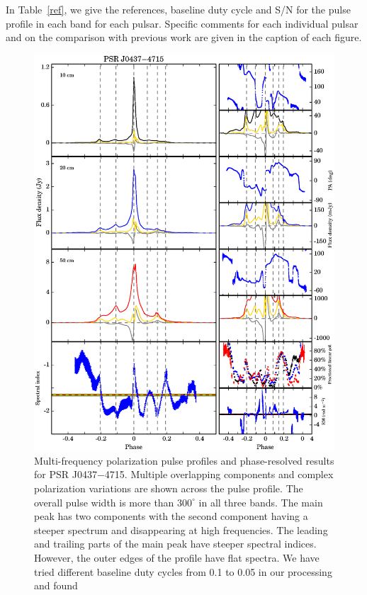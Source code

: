 \documentclass[useAMS,usenatbib]{mn2e}
\begin{document}
\begin{appendix}
In Table~\ref{ref}, we give the references, baseline duty cycle and S/N for the pulse profile in each 
band for each pulsar. Specific comments for each individual pulsar and on the comparison with 
previous work are given in the caption of each figure. 

\newpage
\begin{figure}
\begin{center}
\includegraphics[width=6 in]{0437.ps}
\caption{Multi-frequency polarization pulse profiles and phase-resolved results for PSR J0437$-$4715. 
Multiple overlapping components and complex polarization 
variations are shown across the pulse profile. 
%
The overall pulse width is more than $300^{\circ}$ in all three bands.
%
The main peak has two components with the second component having a steeper 
spectrum and disappearing at high frequencies. The leading and trailing 
parts of the main peak have steeper spectral indices.
%
However, the outer edges of the profile have flat spectra. We have tried 
different baseline duty cycles from 0.1 to 0.05 in our processing and found 
}
\end{center}
\end{figure}
\end{appendix}
\end{document}
